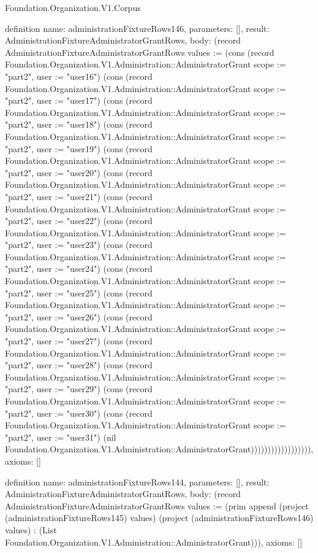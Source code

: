 \begin{lexlean}{Foundation.Organization.V1.Corpus}
\begin{semanticmodule}
definition{
  name: administrationFixtureRows146,
  parameters: [],
  result: AdministrationFixtureAdministratorGrantRows,
  body: (record AdministrationFixtureAdministratorGrantRows {values := (cons (record Foundation.Organization.V1.Administration::AdministratorGrant {scope := "part2", user := "user16"}) (cons (record Foundation.Organization.V1.Administration::AdministratorGrant {scope := "part2", user := "user17"}) (cons (record Foundation.Organization.V1.Administration::AdministratorGrant {scope := "part2", user := "user18"}) (cons (record Foundation.Organization.V1.Administration::AdministratorGrant {scope := "part2", user := "user19"}) (cons (record Foundation.Organization.V1.Administration::AdministratorGrant {scope := "part2", user := "user20"}) (cons (record Foundation.Organization.V1.Administration::AdministratorGrant {scope := "part2", user := "user21"}) (cons (record Foundation.Organization.V1.Administration::AdministratorGrant {scope := "part2", user := "user22"}) (cons (record Foundation.Organization.V1.Administration::AdministratorGrant {scope := "part2", user := "user23"}) (cons (record Foundation.Organization.V1.Administration::AdministratorGrant {scope := "part2", user := "user24"}) (cons (record Foundation.Organization.V1.Administration::AdministratorGrant {scope := "part2", user := "user25"}) (cons (record Foundation.Organization.V1.Administration::AdministratorGrant {scope := "part2", user := "user26"}) (cons (record Foundation.Organization.V1.Administration::AdministratorGrant {scope := "part2", user := "user27"}) (cons (record Foundation.Organization.V1.Administration::AdministratorGrant {scope := "part2", user := "user28"}) (cons (record Foundation.Organization.V1.Administration::AdministratorGrant {scope := "part2", user := "user29"}) (cons (record Foundation.Organization.V1.Administration::AdministratorGrant {scope := "part2", user := "user30"}) (cons (record Foundation.Organization.V1.Administration::AdministratorGrant {scope := "part2", user := "user31"}) (nil Foundation.Organization.V1.Administration::AdministratorGrant)))))))))))))))))}),
  axioms: []
}

definition{
  name: administrationFixtureRows144,
  parameters: [],
  result: AdministrationFixtureAdministratorGrantRows,
  body: (record AdministrationFixtureAdministratorGrantRows {values := (prim append (project (administrationFixtureRows145) values) (project (administrationFixtureRows146) values) : (List Foundation.Organization.V1.Administration::AdministratorGrant))}),
  axioms: []
}


\end{semanticmodule}
\end{lexlean}
